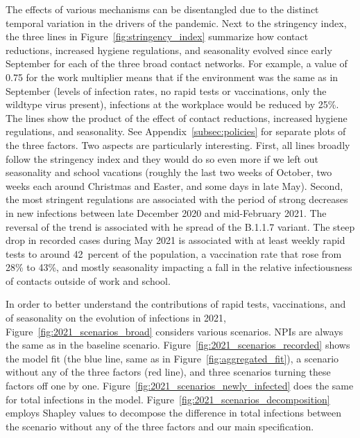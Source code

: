 The effects of various mechanisms can be disentangled due to the distinct temporal
variation in the drivers of the pandemic. Next to the stringency index, the three lines
in Figure~\ref{fig:stringency_index} summarize how contact reductions, increased hygiene
regulations, and seasonality evolved since early September for each of the three broad
contact networks. For example, a value of 0.75 for the work multiplier means that if the
environment was the same as in September (levels of infection rates, no rapid tests or
vaccinations, only the wildtype virus present), infections at the workplace would be
reduced by 25\%. The lines show the product of the effect of contact reductions,
increased hygiene regulations, and seasonality. See Appendix~\ref{subsec:policies} for
separate plots of the three factors. Two aspects are particularly interesting. First, all
lines broadly follow the stringency index and they would do so even more if we left out
seasonality and school vacations (roughly the last two weeks of October, two weeks each
around Christmas and Easter, and some days in late May). Second, the most stringent
regulations are associated with the period of strong decreases in new infections between
late December 2020 and mid-February 2021. The reversal of the trend is associated with he
spread of the B.1.1.7 variant. The steep drop in recorded cases during May 2021 is
associated with at least weekly rapid tests to around 42~percent of the population, a
vaccination rate that rose from 28\% to 43\%, and mostly seasonality impacting a fall in
the relative infectiousness of contacts outside of work and school.

In order to better understand the contributions  of rapid tests, vaccinations, and of
seasonality on the evolution of infections in 2021,
Figure~\ref{fig:2021_scenarios_broad} considers various scenarios. NPIs are always the
same as in the baseline scenario. Figure~\ref{fig:2021_scenarios_recorded} shows the
model fit (the blue line, same as in Figure~\ref{fig:aggregated_fit}), a scenario
without any of the three factors (red line), and three scenarios turning these factors
off one by one. Figure~\ref{fig:2021_scenarios_newly_infected} does the same for total
infections in the model. Figure~\ref{fig:2021_scenarios_decomposition} employs Shapley
values to decompose the difference in total infections between the scenario without any
of the three factors and our main specification.

